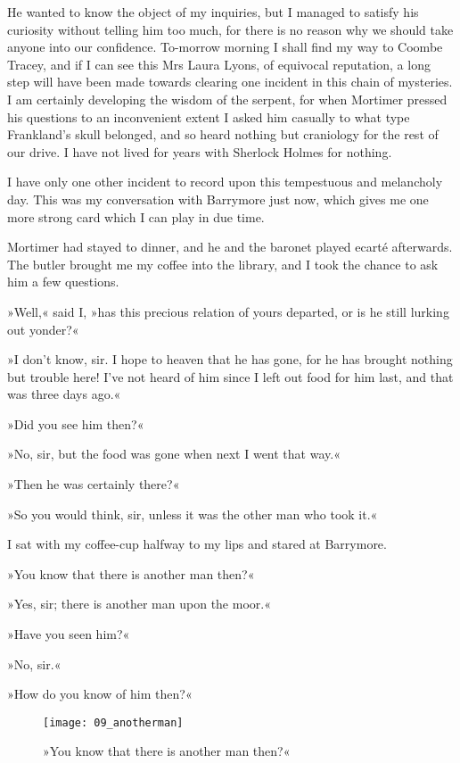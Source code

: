 He wanted to know the object of my inquiries, but I managed to satisfy his curiosity without telling him too much, for there is no reason why we should take anyone into our confidence. To-morrow morning I shall find my way to Coombe Tracey, and if I can see this Mrs Laura Lyons, of equivocal reputation, a long step will have been made towards clearing one incident in this chain of mysteries. I am certainly developing the wisdom of the serpent, for when Mortimer pressed his questions to an inconvenient extent I asked him casually to what type Frankland's skull belonged, and so heard nothing but craniology for the rest of our drive. I have not lived for years with Sherlock Holmes for nothing.

I have only one other incident to record upon this tempestuous and melancholy day. This was my conversation with Barrymore just now, which gives me one more strong card which I can play in due time.

Mortimer had stayed to dinner, and he and the baronet played ecarté afterwards. The butler brought me my coffee into the library, and I took the chance to ask him a few questions.

»Well,« said I, »has this precious relation of yours departed, or is he still lurking out yonder?«

»I don't know, sir. I hope to heaven that he has gone, for he has brought nothing but trouble here! I've not heard of him since I left out food for him last, and that was three days ago.«

»Did you see him then?«

»No, sir, but the food was gone when next I went that way.«

»Then he was certainly there?«

»So you would think, sir, unless it was the other man who took it.«

I sat with my coffee-cup halfway to my lips and stared at Barrymore.

»You know that there is another man then?«

»Yes, sir; there is another man upon the moor.«

»Have you seen him?«

»No, sir.«

»How do you know of him then?«

\begin{figure}[tbh]
\centering
\texttt{[image: 09\_anotherman]}
\caption{»You know that there is another man then?«}
\end{figure}


